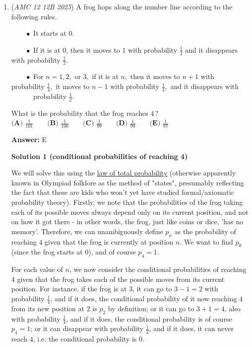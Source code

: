 \begin{enumerate}
 



\textbf{Solution 4 (Engineer's Induction)}

Try it for (3x3), (3x5), (3x7), and you'll see a pattern. Basically, since (1,1) is guaranteed to be a match, we find the gcd of (140, 90), which is 10, and then we add (1,1) to get 11. (Someone add a table it's a really creative solution) 

 


	\item (\textit{AMC 12 12B 2025}) A frog hops along the number line according to the following rules.


 $\qquad\bullet$ It starts at $0$.


 $\qquad\bullet$ If it is at $0$, then it moves to $1$ with probability $\frac{1}{2}$ and it disappears with probability $\frac{1}{2}$.


 $\qquad\bullet$ For $n = 1, 2,$ or $3,$ if it is at $n,$ then it moves to $n+1$ with probability $\frac{1}{4},$ it moves to $n-1$ with probability $\frac{1}{4},$ and it disappears with $\qquad\phantom{\bullet}$ probability $\frac{1}{2}$.


 What is the probability that the frog reaches ${4\,?}$
$\textbf{(A) } \frac1{101} \qquad \textbf{(B) } \frac 1{100} \qquad \textbf{(C) } \frac1{99} \qquad \textbf{(D) } \frac1{98} \qquad \textbf{(E) } \frac1{97}$

 \textbf{Answer: }E



\textbf{Solution 1 (conditional probabilities of reaching 4)}

We will solve this using the \href{https://en.wikipedia.org/wiki/Law\_of\_total\_probability}{law of total probability} (otherwise apparently known in Olympiad folklore as the method of "states", presumably reflecting the fact that these are kids who won't yet have studied formal/axiomatic probability theory). Firstly, we note that the probabilities of the frog taking each of its possible moves always depend only on its current position, and not on how it got there - in other words, the frog, just like coins or dice, 'has no memory'. Therefore, we can unambiguously define $p_n$ as the probability of reaching $4$ given that the frog is currently at position $n$. We want to find $p_0$ (since the frog starts at $0$), and of course $p_4 = 1$.

 
For each value of $n$, we now consider the conditional probabilities of reaching $4$ given that the frog takes each of the possible moves from its current position. For instance, if the frog is at $3$, it can go to $3-1 = 2$ with probability $\frac{1}{4}$, and if it does, the conditional probability of it now reaching $4$ from its new position at $2$ is $p_2$ by definition; or it can go to $3+1 = 4$, also with probability $\frac{1}{4}$, and if it does, the conditional probability is of course $p_4 = 1$; or it can disappear with probability $\frac{1}{2}$, and if it does, it can never reach $4$, i.e. the conditional probability is $0$.


\end{enumerate}

